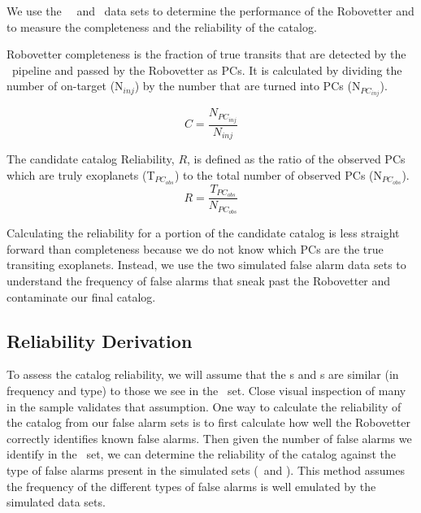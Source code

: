 

\newcommand{\opsfp}{N$_{FP_{obs}}$}
\newcommand{\opspc}{N$_{PC_{obs}}$}
\newcommand{\opsN}{N$_{obs}$}
\newcommand{\trueopspc}{T$_{PC_{obs}}$}
\newcommand{\missedfp}{T$_{FP_{obs}}$ - N$_{FP_{obs}}$}
\newcommand{\invfp}{N$_{FP_{inv}}$}
\newcommand{\invpc}{N$_{PC_{inv}}$}
\newcommand{\invN}{N$_{inv}$}
\newcommand{\sfatce}{SFA-TCE}


We use the \injtce\, \scrtce\ and \invtce\ data sets to determine the performance of the Robovetter and to measure the completeness and the reliability of the catalog. 

Robovetter completeness is the fraction of true transits that are detected by the \Kepler\ pipeline and passed by the Robovetter as PCs.  It is calculated by dividing the number of on-target  (N$_{inj}$) by the number that are turned into PCs (N$_{PC_{inj}}$). 

\begin{equation}
\label{comp}
C = \frac{N_{PC_{inj}}}{N_{inj}}
\end{equation}

The candidate catalog Reliability, $R$, is defined as the ratio of the observed PCs which are truly exoplanets (\trueopspc) to the total number of observed PCs (\opspc). 
\begin{equation}
\label{eq:rel}
R = \frac{T_{PC_{obs}}}{N_{PC_{obs}}}
\end{equation}

Calculating the reliability for a portion of the candidate catalog is less straight forward than completeness because we do not know which PCs are the true transiting exoplanets. Instead, we use the two simulated false alarm data sets to understand the frequency of false alarms that sneak past the Robovetter and contaminate our final catalog.


\subsection{Reliability Derivation}
\label{s:relcalc}
To assess the catalog reliability, we will assume that the \scrtce s and \invtce s are similar (in frequency and type) to those we see in the \opstce\ set. Close visual inspection of many in the sample validates that assumption. One way to calculate the reliability of the catalog from our false alarm sets is to first calculate how well the Robovetter correctly identifies known false alarms.  Then given the number of false alarms we identify in the \opstce\ set, we can determine the reliability of the catalog against the type of false alarms present in the simulated sets (\invtce\ and \scrtce). This method assumes the frequency of the different types of false alarms is well emulated by the simulated data sets. 


